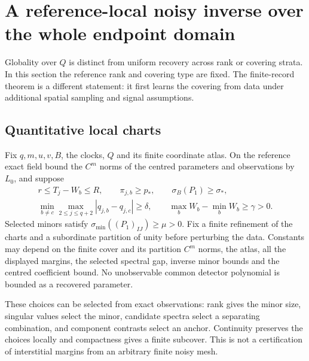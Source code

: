 \section{A reference-local noisy inverse over the whole endpoint domain}
\label{sec:v83-global}
Globality over $Q$ is distinct from uniform recovery across rank or
covering strata. In this section the reference rank and covering type
are fixed. The finite-record theorem is a different statement: it first learns the covering from data under additional
spatial sampling and signal assumptions.

\subsection{Quantitative local charts}
Fix $q,m,u,v,B$, the clocks, $Q$ and its finite coordinate atlas.
On the reference exact field bound the $C^m$ norms of the centred
parameters and observations by $L_0$, and suppose
\begin{gather}
 r\le T_j-W_b\le R,\qquad \pi_{j,b}\ge p_*,\qquad
 \sigma_B(P_1)\ge\sigma_*,\label{eq:v83-margins}\\
 \min_{b\ne c}\max_{2\le j\le q+2}|q_{j,b}-q_{j,c}|\ge\delta,
 \qquad \max_bW_b-\min_bW_b\ge\gamma>0.\nonumber
\end{gather}
Selected minors satisfy $\sigma_{\min}((P_1)_{IJ})\ge\mu>0$.
Fix a finite refinement of the charts and a subordinate partition of
unity before perturbing the data. Constants may depend on the finite
cover and its partition $C^m$ norms, the atlas, all the displayed
margins, the selected spectral gap, inverse minor bounds and the
centred coefficient bound. No unobservable common detector polynomial
is bounded as a recovered parameter.

These choices can be selected from exact observations: rank gives the
minor size, singular values select the minor, candidate spectra select
a separating combination, and component contrasts select an anchor.
Continuity preserves the choices locally and compactness gives a finite
subcover. This is not a certification of interstitial margins from an
arbitrary finite noisy mesh.

